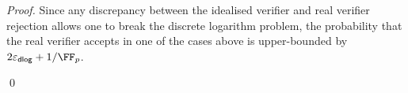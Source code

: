 \begin{proof}
  Since any discrepancy
  between the idealised verifier and real verifier rejection allows
  one to break the discrete logarithm problem, the probability that the real
  verifier accepts in one of the cases above is upper-bounded by
  $2 \epsdlog + \infrac{1}{\FF_p}$.

    \qed
\end{proof}

